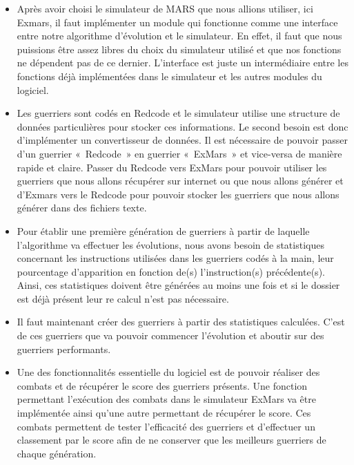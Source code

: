 \documentclass[french]{article}
\begin{document}
        \begin{itemize}
            \item Après avoir choisi le simulateur de MARS que nous allions utiliser, ici Exmars, il faut implémenter un module qui fonctionne comme une interface entre notre algorithme d’évolution et le simulateur. En effet, il faut que nous puissions être assez libres du choix du simulateur utilisé et que nos fonctions ne dépendent pas de ce dernier. L’interface est juste un intermédiaire entre les fonctions déjà implémentées dans le simulateur et les autres modules du logiciel. \\

            \item Les guerriers sont codés en Redcode et le simulateur utilise une structure de données particulières pour stocker ces informations. Le second besoin est donc d’implémenter un convertisseur de données. Il est nécessaire de pouvoir passer d’un guerrier « Redcode » en guerrier « ExMars » et vice-versa de manière rapide et claire. Passer du Redcode vers ExMars pour pouvoir utiliser les guerriers que nous allons récupérer sur internet ou que nous allons générer et d’Exmars vers le Redcode pour pouvoir stocker les guerriers que nous allons générer dans des fichiers texte. \\
            
            \item Pour établir une première génération de guerriers à partir de laquelle l’algorithme va effectuer les évolutions, nous avons besoin de statistiques concernant les instructions utilisées dans les guerriers codés à la main, leur pourcentage d’apparition en fonction de(s) l’instruction(s) précédente(s). Ainsi, ces statistiques doivent être générées au moins une fois et si le dossier est déjà présent leur re calcul n’est pas nécessaire. \\
            
            \item Il faut maintenant créer des guerriers à partir des statistiques calculées. C’est de ces guerriers que va pouvoir commencer l’évolution et aboutir sur des guerriers performants. \\
            
            \item Une des fonctionnalités essentielle du logiciel est de pouvoir réaliser des combats et de récupérer le score des guerriers présents. Une fonction permettant l’exécution des combats dans le simulateur ExMars va être implémentée ainsi qu’une autre permettant de récupérer le score. Ces combats permettent de tester l’efficacité des guerriers et d’effectuer un classement par le score afin de ne conserver que les meilleurs guerriers de chaque génération. \\
            

\end{itemize}
\end{document}
